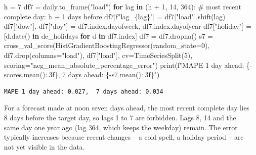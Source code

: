 \documentclass[
  letterpaper,
  DIV=11,
  numbers=noendperiod]{scrreprt}
\newenvironment{Shaded}{\begin{snugshade}}{\end{snugshade}}
\newcommand{\BuiltInTok}[1]{\textcolor[rgb]{0.00,0.23,0.31}{#1}}
\newcommand{\CommentTok}[1]{\textcolor[rgb]{0.37,0.37,0.37}{#1}}
\newcommand{\ControlFlowTok}[1]{\textcolor[rgb]{0.00,0.23,0.31}{\textbf{#1}}}
\newcommand{\DecValTok}[1]{\textcolor[rgb]{0.68,0.00,0.00}{#1}}
\newcommand{\KeywordTok}[1]{\textcolor[rgb]{0.00,0.23,0.31}{\textbf{#1}}}
\newcommand{\NormalTok}[1]{\textcolor[rgb]{0.00,0.23,0.31}{#1}}
\newcommand{\OperatorTok}[1]{\textcolor[rgb]{0.37,0.37,0.37}{#1}}
\newcommand{\SpecialCharTok}[1]{\textcolor[rgb]{0.37,0.37,0.37}{#1}}
\newcommand{\SpecialStringTok}[1]{\textcolor[rgb]{0.13,0.47,0.30}{#1}}
\newcommand{\StringTok}[1]{\textcolor[rgb]{0.13,0.47,0.30}{#1}}
\begin{document}
\begin{tcolorbox}[enhanced jigsaw, left=2mm, title=\textcolor{quarto-callout-caution-color}{\faFire}\hspace{0.5em}{Solution to Exercise 4}, opacityback=0, breakable, rightrule=.15mm, arc=.35mm, toptitle=1mm, colbacktitle=quarto-callout-caution-color!10!white, opacitybacktitle=0.6, coltitle=black, colframe=quarto-callout-caution-color-frame, bottomrule=.15mm, leftrule=.75mm, bottomtitle=1mm, titlerule=0mm, toprule=.15mm, colback=white]

\begin{Shaded}
\begin{Highlighting}[]
\NormalTok{h }\OperatorTok{=} \DecValTok{7}
\NormalTok{df7 }\OperatorTok{=}\NormalTok{ daily.to\_frame(}\StringTok{"load"}\NormalTok{)}
\ControlFlowTok{for}\NormalTok{ lag }\KeywordTok{in}\NormalTok{ (h }\OperatorTok{+} \DecValTok{1}\NormalTok{, }\DecValTok{14}\NormalTok{, }\DecValTok{364}\NormalTok{):                       }\CommentTok{\# most recent complete day: h + 1 days before}
\NormalTok{    df7[}\SpecialStringTok{f"lag\_}\SpecialCharTok{\{}\NormalTok{lag}\SpecialCharTok{\}}\SpecialStringTok{"}\NormalTok{] }\OperatorTok{=}\NormalTok{ df7[}\StringTok{"load"}\NormalTok{].shift(lag)}
\NormalTok{df7[}\StringTok{"dow"}\NormalTok{], df7[}\StringTok{"doy"}\NormalTok{] }\OperatorTok{=}\NormalTok{ df7.index.dayofweek, df7.index.dayofyear}
\NormalTok{df7[}\StringTok{"holiday"}\NormalTok{] }\OperatorTok{=}\NormalTok{ [d.date() }\KeywordTok{in}\NormalTok{ de\_holidays }\ControlFlowTok{for}\NormalTok{ d }\KeywordTok{in}\NormalTok{ df7.index]}
\NormalTok{df7 }\OperatorTok{=}\NormalTok{ df7.dropna()}
\NormalTok{s7 }\OperatorTok{=}\NormalTok{ cross\_val\_score(HistGradientBoostingRegressor(random\_state}\OperatorTok{=}\DecValTok{0}\NormalTok{), df7.drop(columns}\OperatorTok{=}\StringTok{"load"}\NormalTok{), df7[}\StringTok{"load"}\NormalTok{],}
\NormalTok{                     cv}\OperatorTok{=}\NormalTok{TimeSeriesSplit(}\DecValTok{5}\NormalTok{), scoring}\OperatorTok{=}\StringTok{"neg\_mean\_absolute\_percentage\_error"}\NormalTok{)}
\BuiltInTok{print}\NormalTok{(}\SpecialStringTok{f"MAPE 1 day ahead: }\SpecialCharTok{\{}\OperatorTok{{-}}\NormalTok{scores}\SpecialCharTok{.}\NormalTok{mean()}\SpecialCharTok{:.3f\}}\SpecialStringTok{,  7 days ahead: }\SpecialCharTok{\{}\OperatorTok{{-}}\NormalTok{s7}\SpecialCharTok{.}\NormalTok{mean()}\SpecialCharTok{:.3f\}}\SpecialStringTok{"}\NormalTok{)}
\end{Highlighting}
\end{Shaded}

\begin{verbatim}
MAPE 1 day ahead: 0.027,  7 days ahead: 0.034
\end{verbatim}

For a forecast made at noon seven days ahead, the most recent complete
day lies 8 days before the target day, so lags 1 to 7 are forbidden.
Lags 8, 14 and the same day one year ago (lag 364, which keeps the
weekday) remain. The error typically increases because recent changes --
a cold spell, a holiday period -- are not yet visible in the data.

\end{tcolorbox}
\end{document}
